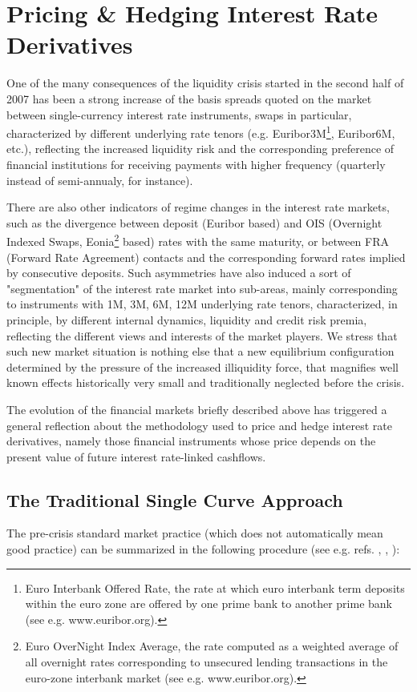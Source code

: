 \documentclass[11pt,reqno]{amsart}
\begin{document}
\section{\label{SecPricing}Pricing \& Hedging Interest Rate Derivatives}
One of the many consequences of the liquidity crisis started in the second half of 2007 has been a strong increase of the basis spreads quoted on the market between single-currency interest rate instruments, swaps in particular, characterized by different underlying rate tenors (e.g. Euribor3M\footnote{Euro Interbank Offered Rate, the rate at which euro interbank term deposits within the euro zone are offered by one prime bank to another prime bank (see e.g. www.euribor.org).}, Euribor6M, etc.), reflecting the increased liquidity risk and the corresponding preference of financial institutions for receiving payments with higher frequency (quarterly instead of semi-annualy, for instance).
\par
There are also other indicators of regime changes in the interest rate markets, such as the divergence between deposit (Euribor based) and OIS (Overnight Indexed Swaps, Eonia\footnote{Euro OverNight Index Average, the rate computed as a weighted average of all overnight rates corresponding to unsecured lending transactions in the euro-zone interbank market (see e.g. www.euribor.org).} based) rates with the same maturity, or between FRA (Forward Rate Agreement) contacts and the corresponding forward rates implied by consecutive deposits. Such asymmetries have also induced a sort of "segmentation" of the interest rate market into sub-areas, mainly corresponding to instruments with 1M, 3M, 6M, 12M underlying rate tenors, characterized, in principle, by different internal dynamics, liquidity and credit risk premia, reflecting the different views and interests of the market players. We stress that such new market situation is nothing else that a new equilibrium configuration determined by the pressure of the increased illiquidity force, that magnifies well known effects historically very small and traditionally neglected before the crisis.
\par
The evolution of the financial markets briefly described above has triggered a general reflection about the methodology used to price and hedge interest rate derivatives, namely those financial instruments whose price depends on the present value of future interest rate-linked cashflows.

\subsection{\label{SecSingleCurve}The Traditional Single Curve Approach}
The pre-crisis standard market practice (which does not automatically mean good practice) can be summarized in the following procedure (see e.g. refs. \cite{Ron00}, \cite{HagWes06}, \cite{And07} \cite{HagWes08}):
\end{document}
